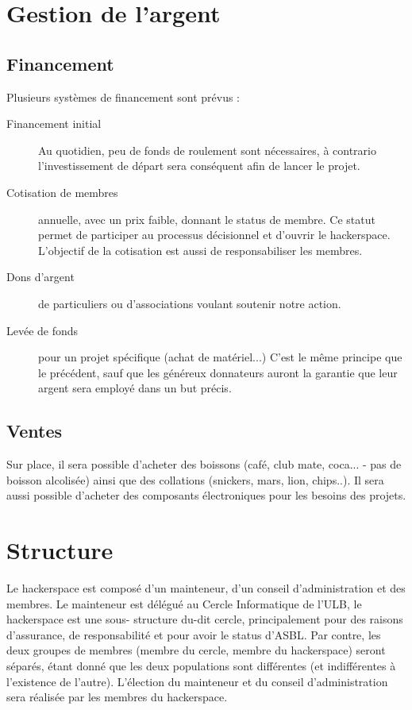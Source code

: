 \documentclass{article}
\begin{document}
\section{Gestion de l'argent}
\subsection{Financement}

Plusieurs systèmes de financement sont prévus :
\begin{description}
\item[Financement initial]
Au quotidien, peu de fonds de roulement sont nécessaires, à contrario l'investissement de départ sera conséquent afin de lancer le projet.
\item[Cotisation de membres] annuelle, avec un prix faible, donnant le status de membre. 
Ce statut permet de participer au processus décisionnel et d'ouvrir le hackerspace.
L'objectif de la cotisation est aussi de responsabiliser les membres.
\item[Dons d'argent] de particuliers ou d'associations voulant soutenir notre action.
\item[Levée de fonds] pour un projet spécifique (achat de matériel...) C'est 
le même principe que le précédent, sauf que les généreux donnateurs auront la 
garantie que leur argent sera employé dans un but précis.\end{description}

\subsection{Ventes}

Sur place, il sera possible d'acheter des boissons (café, club mate, coca... - 
pas de boisson alcolisée) ainsi que des collations (snickers, mars, lion, chips..).
Il sera aussi possible d'acheter des composants électroniques pour les besoins des projets.


\section{Structure}

Le hackerspace est composé d'un mainteneur, d'un conseil d'administration et des membres.
Le mainteneur est délégué au Cercle Informatique de l'ULB, le hackerspace est 
une sous- structure du-dit cercle, principalement pour des raisons d'assurance,
de responsabilité et pour avoir le status d'ASBL. Par contre, les deux groupes de 
membres (membre du cercle, membre du hackerspace) seront séparés, étant donné que 
les deux populations sont différentes (et indifférentes à l'existence de l'autre). 
L'élection du mainteneur et du conseil d'administration sera réalisée par les 
membres du hackerspace.
\end{document}
